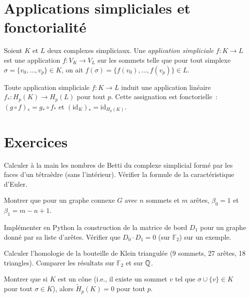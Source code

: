 \section{Applications simpliciales et fonctorialit\'e}

\begin{definition}
Soient $K$ et $L$ deux complexes simpliciaux. Une \emph{application
simpliciale} $f : K \to L$ est une application $f : V_K \to V_L$ sur
les sommets telle que pour tout simplexe $\sigma = \{v_0, \ldots, v_p\}
\in K$, on ait $f(\sigma) = \{f(v_0), \ldots, f(v_p)\} \in L$.
\end{definition}

\begin{proposition}
Toute application simpliciale $f : K \to L$ induit une application
lin\'eaire $f_* : H_p(K) \to H_p(L)$ pour tout $p$. Cette assignation
est fonctorielle~: $(g \circ f)_* = g_* \circ f_*$ et
$(\mathrm{id}_K)_* = \mathrm{id}_{H_p(K)}$.
\end{proposition}

\section{Exercices}

\begin{exercice}
Calculer \`a la main les nombres de Betti du complexe simplicial form\'e
par les faces d'un t\'etra\`edre (sans l'int\'erieur). V\'erifier la
formule de la caract\'eristique d'Euler.
\end{exercice}

\begin{exercice}
Montrer que pour un graphe connexe $G$ avec $n$ sommets et $m$ ar\^etes,
$\beta_0 = 1$ et $\beta_1 = m - n + 1$.
\end{exercice}

\begin{exercice}
Impl\'ementer en Python la construction de la matrice de bord
$D_1$ pour un graphe donn\'e par sa liste d'ar\^etes. V\'erifier que
$D_0 \cdot D_1 = 0$ (sur $\mathbb{F}_2$) sur un exemple.
\end{exercice}

\begin{exercice}
Calculer l'homologie de la bouteille de Klein triangul\'ee (9 sommets,
27 ar\^etes, 18 triangles). Comparer les r\'esultats sur $\mathbb{F}_2$
et sur $\mathbb{Q}$.
\end{exercice}

\begin{exercice}
Montrer que si $K$ est un c\^one (i.e., il existe un sommet $v$ tel que
$\sigma \cup \{v\} \in K$ pour tout $\sigma \in K$), alors
$\tilde{H}_p(K) = 0$ pour tout $p$.
\end{exercice}

